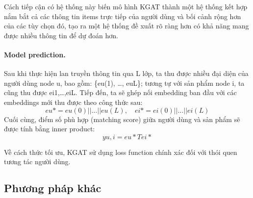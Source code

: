 Cách tiếp cận có hệ thống này biến mô hình KGAT thành một hệ thống kết hợp nắm bắt cả các thông tin items trực tiếp của người dùng và bối cảnh rộng hơn của các tùy chọn đó, tạo ra một hệ thống đề xuất rõ ràng hơn có khả năng mang được nhiều thông tin để dự đoán hơn.

\paragraph{Model prediction.}
Sau khi thực hiện lan truyền thông tin qua L lớp, ta thu được nhiều đại diện của người dùng node u, bao gồm: \{eu(1), …, euL\}; tương tự với sản phẩm node i, ta cũng thu được ei1,…,eiL. Tiếp đến, ta sẽ ghép nối embedding ban đầu với các embeddings mới thu được theo công thức sau:
\[
eu* = eu(0) || … || eu(L), \quad ei* = ei(0) || … || ei(L)
\]
Cuối cùng, điểm số phù hợp (matching score) giữa người dùng và sản phẩm sẽ được tính bằng inner product:
\[
yu,i = eu*T e i*
\]

Về cách thức tối ưu, KGAT sử dụng loss function chính xác đối với thói quen tương tác người dùng.

\subsection{Phương pháp khác}
